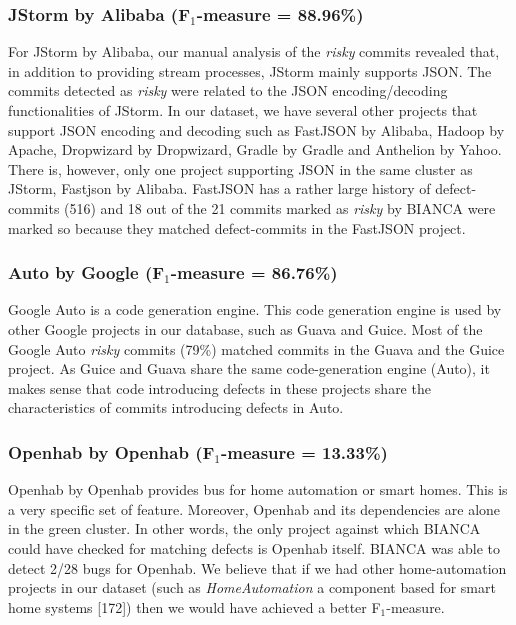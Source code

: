 \documentclass[12pt]{report}
\begin{document}
\subsubsection{\texorpdfstring{JStorm by Alibaba (F\(_1\)-measure =
88.96\%)}{JStorm by Alibaba (F\_1-measure = 88.96\%)}}\label{jstorm-by-alibaba-fux5f1-measure-88.96}

For JStorm by Alibaba, our manual analysis of the \emph{risky} commits
revealed that, in addition to providing stream processes, JStorm mainly
supports JSON. The commits detected as \emph{risky} were related to the
JSON encoding/decoding functionalities of JStorm. In our dataset, we
have several other projects that support JSON encoding and decoding such
as FastJSON by Alibaba, Hadoop by Apache, Dropwizard by Dropwizard,
Gradle by Gradle and Anthelion by Yahoo. There is, however, only one
project supporting JSON in the same cluster as JStorm, Fastjson by
Alibaba. FastJSON has a rather large history of defect-commits (516) and
18 out of the 21 commits marked as \emph{risky} by BIANCA were marked so
because they matched defect-commits in the FastJSON project.

\subsubsection{\texorpdfstring{Auto by Google (F\(_1\)-measure =
86.76\%)}{Auto by Google (F\_1-measure = 86.76\%)}}\label{auto-by-google-fux5f1-measure-86.76}

Google Auto is a code generation engine. This code generation engine is
used by other Google projects in our database, such as Guava and Guice.
Most of the Google Auto \emph{risky} commits (79\%) matched commits in
the Guava and the Guice project. As Guice and Guava share the same
code-generation engine (Auto), it makes sense that code introducing
defects in these projects share the characteristics of commits
introducing defects in Auto.

\subsubsection{\texorpdfstring{Openhab by Openhab (F\(_1\)-measure =
13.33\%)}{Openhab by Openhab (F\_1-measure = 13.33\%)}}\label{openhab-by-openhab-fux5f1-measure-13.33}

Openhab by Openhab provides bus for home automation or smart homes. This
is a very specific set of feature. Moreover, Openhab and its
dependencies are alone in the green cluster. In other words, the only
project against which BIANCA could have checked for matching defects is
Openhab itself. BIANCA was able to detect 2/28 bugs for Openhab. We
believe that if we had other home-automation projects in our dataset
(such as \emph{HomeAutomation} a component based for smart home systems
{[}172{]}) then we would have achieved a better F\(_1\)-measure.
\end{document}
